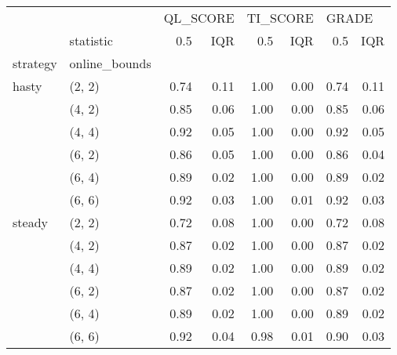 \begin{tabular}{llrrrrrr}
\toprule
       & {} & \multicolumn{2}{l}{QL\_SCORE} & \multicolumn{2}{l}{TI\_SCORE} & \multicolumn{2}{l}{GRADE} \\
       & statistic &      0.5 &  IQR &      0.5 &  IQR &   0.5 &  IQR \\
strategy & online\_bounds &          &      &          &      &       &      \\
\midrule
hasty & (2, 2) &     0.74 & 0.11 &     1.00 & 0.00 &  0.74 & 0.11 \\
       & (4, 2) &     0.85 & 0.06 &     1.00 & 0.00 &  0.85 & 0.06 \\
       & (4, 4) &     0.92 & 0.05 &     1.00 & 0.00 &  0.92 & 0.05 \\
       & (6, 2) &     0.86 & 0.05 &     1.00 & 0.00 &  0.86 & 0.04 \\
       & (6, 4) &     0.89 & 0.02 &     1.00 & 0.00 &  0.89 & 0.02 \\
       & (6, 6) &     0.92 & 0.03 &     1.00 & 0.01 &  0.92 & 0.03 \\
steady & (2, 2) &     0.72 & 0.08 &     1.00 & 0.00 &  0.72 & 0.08 \\
       & (4, 2) &     0.87 & 0.02 &     1.00 & 0.00 &  0.87 & 0.02 \\
       & (4, 4) &     0.89 & 0.02 &     1.00 & 0.00 &  0.89 & 0.02 \\
       & (6, 2) &     0.87 & 0.02 &     1.00 & 0.00 &  0.87 & 0.02 \\
       & (6, 4) &     0.89 & 0.02 &     1.00 & 0.00 &  0.89 & 0.02 \\
       & (6, 6) &     0.92 & 0.04 &     0.98 & 0.01 &  0.90 & 0.03 \\
\bottomrule
\end{tabular}
